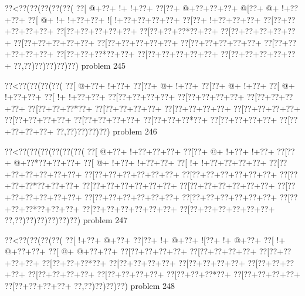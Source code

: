 \vbox{\vbox{\goo
\0??<\0??(\0??(\0??(\0??(\0??(
\0??[\- @+\0??+\- !+\- !+\0??+
\0??[\0??+\- @+\0??+\0??+\0??+
\- @[\0??+\- @+\- !+\0??+\0??+
\0??[\- @+\- !+\- !+\0??+\0??+
\- ![\- !+\0??+\0??+\0??+\0??+
\0??[\0??+\- !+\0??+\0??+\0??+
\0??[\0??+\0??+\0??+\0??+\0??+
\0??[\0??+\0??+\0??+\0??+\0??+
\0??[\0??+\0??+\0??*\0??+\0??+
\0??[\0??+\0??+\0??+\0??+\0??+
\0??[\0??+\0??+\0??+\0??+\0??+
\0??[\0??+\0??+\0??+\0??+\0??+
\0??[\0??+\0??+\0??+\0??+\0??+
\0??[\0??+\0??+\0??+\0??+\0??+
\0??[\0??+\0??+\0??*\0??+\0??+
\0??[\0??+\0??+\0??+\0??+\0??+
\0??[\0??+\0??+\0??+\0??+\0??+
\0??,\0??)\0??)\0??)\0??)\0??)
}
\hfil problem 245\hfil\break
}

\vbox{\vbox{\goo
\0??<\0??(\0??(\0??(\0??(
\0??[\- @+\0??+\- !+\0??+
\0??[\0??+\- @+\- !+\0??+
\0??[\0??+\- @+\- !+\0??+
\0??[\- @+\- !+\0??+\0??+
\0??[\- !+\- !+\0??+\0??+
\0??[\0??+\0??+\0??+\0??+
\0??[\0??+\0??+\0??+\0??+
\0??[\0??+\0??+\0??+\0??+
\0??[\0??+\0??+\0??*\0??+
\0??[\0??+\0??+\0??+\0??+
\0??[\0??+\0??+\0??+\0??+
\0??[\0??+\0??+\0??+\0??+
\0??[\0??+\0??+\0??+\0??+
\0??[\0??+\0??+\0??+\0??+
\0??[\0??+\0??+\0??*\0??+
\0??[\0??+\0??+\0??+\0??+
\0??[\0??+\0??+\0??+\0??+
\0??,\0??)\0??)\0??)\0??)
}
\hfil problem 246\hfil\break
}

\vbox{\vbox{\goo
\0??<\0??(\0??(\0??(\0??(\0??(\0??(
\0??[\- @+\0??+\- !+\0??+\0??+\0??+
\0??[\0??+\- @+\- !+\0??+\- !+\0??+
\0??[\0??+\- @+\0??*\0??+\0??+\0??+
\0??[\- @+\- !+\0??+\- !+\0??+\0??+
\0??[\- !+\- !+\0??+\0??+\0??+\0??+
\0??[\0??+\0??+\0??+\0??+\0??+\0??+
\0??[\0??+\0??+\0??+\0??+\0??+\0??+
\0??[\0??+\0??+\0??+\0??+\0??+\0??+
\0??[\0??+\0??+\0??*\0??+\0??+\0??+
\0??[\0??+\0??+\0??+\0??+\0??+\0??+
\0??[\0??+\0??+\0??+\0??+\0??+\0??+
\0??[\0??+\0??+\0??+\0??+\0??+\0??+
\0??[\0??+\0??+\0??+\0??+\0??+\0??+
\0??[\0??+\0??+\0??+\0??+\0??+\0??+
\0??[\0??+\0??+\0??*\0??+\0??+\0??+
\0??[\0??+\0??+\0??+\0??+\0??+\0??+
\0??[\0??+\0??+\0??+\0??+\0??+\0??+
\0??,\0??)\0??)\0??)\0??)\0??)\0??)
}
\hfil problem 247\hfil\break
}

\vbox{\vbox{\goo
\0??<\0??(\0??(\0??(\0??(
\0??[\- !+\0??+\- @+\0??+
\0??[\0??+\- !+\- @+\0??+
\- ![\0??+\- !+\- @+\0??+
\0??[\- !+\- @+\0??+\0??+
\0??[\- @+\- @+\0??+\0??+
\0??[\0??+\0??+\0??+\0??+
\0??[\0??+\0??+\0??+\0??+
\0??[\0??+\0??+\0??+\0??+
\0??[\0??+\0??+\0??*\0??+
\0??[\0??+\0??+\0??+\0??+
\0??[\0??+\0??+\0??+\0??+
\0??[\0??+\0??+\0??+\0??+
\0??[\0??+\0??+\0??+\0??+
\0??[\0??+\0??+\0??+\0??+
\0??[\0??+\0??+\0??*\0??+
\0??[\0??+\0??+\0??+\0??+
\0??[\0??+\0??+\0??+\0??+
\0??,\0??)\0??)\0??)\0??)
}
\hfil problem 248\hfil\break
}

